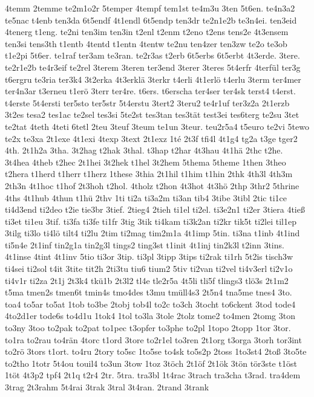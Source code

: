 {4temm
2temme
te2m1o2r
5temper
4tempf
tem1st
te4m3u
3ten
5t6en.
te4n3a2
te5nac
t4enb
ten3da
6t5endf
4t1endl
6t5endp
ten3dr
te2n1e2b
te3n4ei.
ten3eid
4tenerg
t1eng.
te2ni
ten3im
ten3in
t2enl
t2enm
t2eno
t2ens
tens2e
4t3ensem
ten3si
tens3th
t1entb
4tentd
t1entn
4tentw
te2nu
ten4zer
ten3zw
te2o
te3ob
t1e2pi
5t6er.
te1raf
ter3am
te3ran.
te2r3as
t2erb
6t5erbs
6t5erbt
4t3erde.
3tere.
te2r1e2b
te4r3eif
te2rel
3terem
3teren
ter3end
3terer
3teres
5t4erfr
4terfül
ter3g
t6ergru
te3ria
ter3k4
3t2erka
4t3erklä
3terkr
t4erli
4t1erlö
t4erlu
3term
ter4mer
ter4n3ar
t3erneu
t1erö
3terr
ter4re.
t6ers.
t6erscha
ter4ser
ter4sk
terst4
t4erst.
t4erste
5t4ersti
ter5sto
ter5str
5t4erstu
3tert2
3teru2
te4r1uf
ter3z2a
2t1erzb
3t2es
tesa2
tes1ac
te2sel
tes3si
5te2st
tes3tan
tes3tät
test3ei
tes6terg
te2su
3tet
te2tat
4teth
4teti
6tetl
2teu
3teuf
3teum
te1un
3teur.
teu2r5a4
t5euro
te2vi
5tewo
te2x
te3xa
2t1exe
4t1exi
4texp
3text
2t1exz
1té
2t3f
tfi4l
4t1g4
tg2a
t3ge
tger2
4th.
2t1h2a
3tha.
3t2hag
t2hak
3thal.
t3hap
t2har
4t3hau
4t1hä
2thc
t2he.
3t4hea
4theb
t2hec
2t1hei
3t2hek
t1hel
3t2hem
5thema
5theme
1then
3theo
t2hera
t1herd
t1herr
t1herz
1these
3thia
2t1hil
t1him
t1hin
2thk
4th3l
4th3m
2th3n
4t1hoc
t1hof
2t3hoh
t2hol.
4tholz
t2hon
4t3hot
4t3hö
2thp
3thr2
5thrine
4ths
4t1hub
4thun
t1hü
2thv
1ti
ti2a
ti3a2m
ti3an
tib4
3tibe
3tibl
2tic
ti1ce
ti4d3end
ti2deo
t2ie
tie3br
3tief.
2tieg4
2tieh
ti1el
ti2el.
ti3e2n1
ti2er
3tiera
4tieß
ti3et
ti1eu
3tif.
ti3fa
ti3fe
ti1fr
3tig
3tik
ti4kam
ti3k2an
ti2kr
tik5t
ti2lei
til1ep
3tilg
ti3lo
ti4lö
tilt4
ti2lu
2tim
ti2mag
tim2m1a
4t1imp
5tin.
ti3na
t1inb
4t1ind
ti5n4e
2t1inf
tin2g1a
tin2g3l
tings2
ting3st
t1init
4t1inj
tin2k3l
t2inn
3tins.
4t1inse
4tint
4t1inv
5tio
ti3or
3tip.
ti3pl
3tipp
3tips
ti2rak
ti1rh
5t2is
tisch3w
ti4sei
ti2sol
t4it
3tite
tit2h
2ti3tu
tiu6
tium2
5tiv
ti2van
ti2vel
ti4v3erl
ti2v1o
ti4v1r
ti2za
2t1j
2t3k4
tkü1b
2t3l2
tl4e
tle2r5a
4t5li
tli5f
tlings3
tlö3s
2t1m2
t5ma
tmen2s
tmen6t
tmin4s
tmo4des
t3mu
tmüll4s3
2t5n4
tna5me
tnes4
3to.
toa4
to5ar
to5at
1tob
to3be
2tobj
tob4l
to2c
to3ch
3tocht
to6ckent
3tod
tode4
4to2d1er
tode6s
to4d1u
1tok4
1tol
to3la
3tole
2tolz
tome2
to4men
2tomg
3ton
to3ny
3too
to2pak
to2pat
to1pec
t3opfer
to3phe
to2pl
1topo
2topp
1tor
3tor.
to1ra
to2rau
to4rän
4torc
t1ord
3tore
to2r1el
to3ren
2t1org
t3orga
3torh
tor3int
to2rö
3tors
t1ort.
to4ru
2tory
to5sc
1to5se
to4sk
to5s2p
2toss
1to3st4
2toß
3to5te
to2tho
1totr
5t4ou
touil4
to3un
3tow
1toz
3töch
2t1öf
2t1ök
3tön
tör3ste
t1öst
1töt
4t3p2
tpf4
2t1q
t2r4
2tr.
5tra.
tra3bl
1t4rac
3trach
tra3cha
t3rad.
tra4dem
3trag
2t3rahm
5t4rai
3trak
3tral
3t4ran.
2trand
3trank
}
